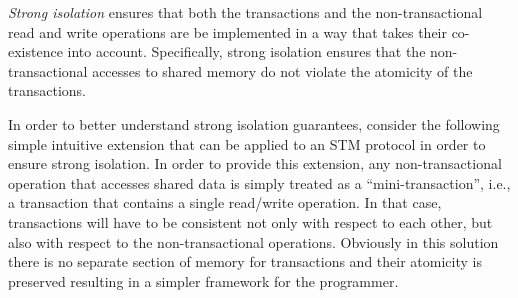 \emph{Strong isolation} ensures that  
both the  transactions  and  the non-transactional
read and write operations are be implemented in a way  
that  takes their co-existence  into account.
Specifically, strong isolation ensures that the non-transactional accesses to shared memory
do not violate the atomicity of the transactions.

In order to better understand strong isolation guarantees, consider
the following simple intuitive extension that can be applied to an STM protocol
in order to ensure strong isolation.
In order to provide this extension, any non-transactional operation that 
accesses shared data is simply treated as a ``mini-transaction'', i.e., a transaction  that contains a
single read/write operation. In that case,  transactions  will have to  be  
consistent  not only with 
respect to each other, but 
also with respect to the  non-transactional operations.
Obviously in this solution there is no separate section of memory for transactions
and their atomicity is preserved resulting in a simpler framework for
the programmer.



